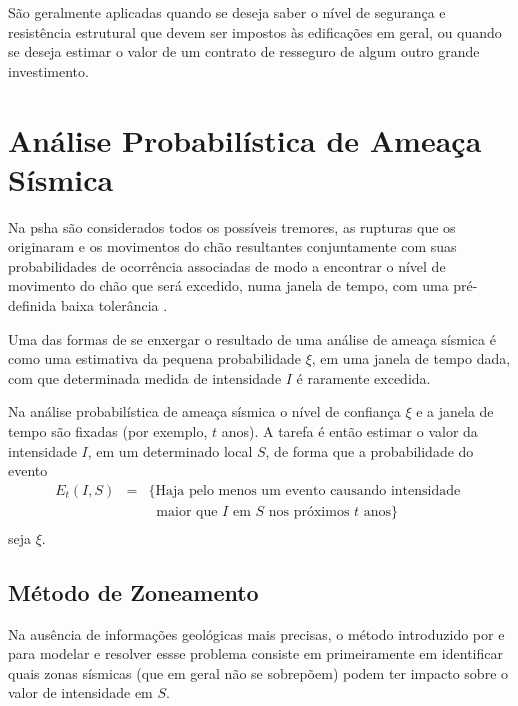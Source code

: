 São geralmente aplicadas quando
se deseja saber o nível de segurança e resistência estrutural que devem ser impostos 
às edificações em geral, ou quando se deseja estimar o valor de um contrato de resseguro
de algum outro grande investimento.


\section{Análise Probabilística de Ameaça Sísmica }
\label{sec:psha}


Na \gls{psha} são considerados todos os possíveis tremores, as rupturas que os originaram e os movimentos do chão
resultantes conjuntamente com suas probabilidades de ocorrência associadas de modo a encontrar o nível de movimento do
chão que será excedido, numa janela de tempo, com uma pré-definida baixa tolerância \citep{baker_2008-1}.

Uma das formas de se enxergar o resultado de uma análise de ameaça sísmica
é como uma estimativa da pequena probabilidade $\xi$, em uma janela de tempo dada, 
com que determinada medida de intensidade $I$ é raramente excedida.

Na análise probabilística de ameaça sísmica o nível de confiança $\xi$ 
e a janela de tempo são fixadas (por exemplo, $t$ anos). A tarefa é então estimar
o valor da intensidade $I$, em um determinado local $S$, de forma que a probabilidade 
do evento
\begin{equation} \label{eventEt}
\begin{array}{lll}
 E_t(I, S)&=&\{\mbox{Haja pelo menos um evento causando intensidade }  \\
 &&  \;\;\mbox{maior que $I$ em }S  \mbox{ nos próximos }t \mbox{ anos}\} \\
\end{array}
\end{equation}
seja $\xi$.


\subsection{Método de Zoneamento}
\label{sec:zoneamento}

Na ausência de informações geológicas mais precisas, o método introduzido por \citet{cornell_1968} e
\citet{mcguire_1976} para modelar e resolver essse problema consiste em 
primeiramente em identificar quais zonas sísmicas (que em geral não se sobrepõem) 
podem ter impacto sobre o valor de intensidade em $S$.

